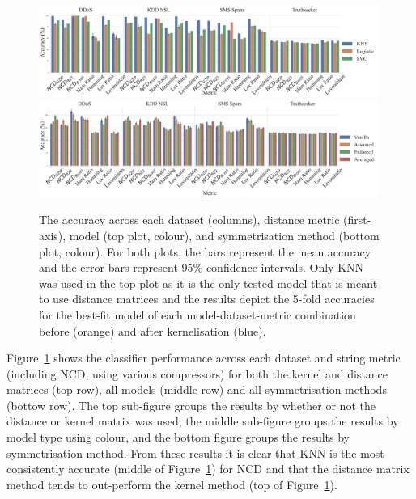 \documentclass[preprint,12pt]{article}
\begin{document}
\begin{figure}[!htb]
    \centering
    \includegraphics[width=0.99\textwidth]{images/accuracy_vs_metric.pdf}
    \hfill
    \includegraphics[width=0.99\textwidth]{images/accuracy_vs_symmetry.pdf}
    \caption{
    The accuracy across each dataset (columns), distance metric (first-axis),  model (top plot, colour), and symmetrisation method (bottom plot, colour).
    For both plots, the bars represent the mean accuracy and the error bars represent 95\% confidence intervals.
    Only KNN was used in the top plot as it is the only tested model that is meant to use distance matrices and the results depict the 5-fold accuracies for the best-fit model of each model-dataset-metric combination before (orange) and after kernelisation (blue).
    }
    \label{fig:acc}
\end{figure}

Figure~\ref{fig:acc} shows the classifier performance across each dataset and string metric (including NCD, using various compressors) for both the kernel and distance matrices (top row), all models (middle row) and all symmetrisation methods (bottow row).
The top sub-figure groups the results by whether or not the distance or kernel matrix was used, the middle sub-figure groups the results by model type using colour, and the bottom figure groups the results by symmetrisation method.
From these results it is clear that KNN is the most consistently accurate (middle of Figure~\ref{fig:acc}) for NCD and that the distance matrix method tends to out-perform the kernel method (top of Figure~\ref{fig:acc}).
\end{document}
